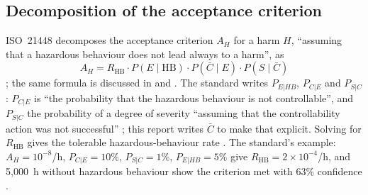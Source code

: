 \documentclass[11pt,a4paper]{article}
\newcommand{\RHB}{R_{\mathrm{HB}}}
\begin{document}
\subsection{Decomposition of the acceptance criterion}
ISO~21448 decomposes the acceptance criterion $A_H$ for a harm $H$, ``assuming that a hazardous behaviour does not lead always to a harm'', as
\begin{equation}
A_H = \RHB \cdot P(E\mid \mathrm{HB}) \cdot P(\bar C\mid E)\cdot P(S\mid \bar C)
\label{eq:annexc}
\end{equation}
\cite[C.2.1, Formula~(C.1), p.~127]{iso21448}; the same formula is discussed in \cite[Sec.~IV-B(a), Eq.~(1)]{putze2023} and \cite[Sec.~V, Eqs.~(6)--(7)]{betschinske2025}. The standard writes $P_{E|HB}$, $P_{C|E}$ and $P_{S|C}$: $P_{C|E}$ is ``the probability that the hazardous behaviour is not controllable'', and $P_{S|C}$ the probability of a degree of severity ``assuming that the controllability action was not successful'' \cite[C.2.1, p.~126]{iso21448}; this report writes $\bar C$ to make that explicit. Solving for $\RHB$ gives the tolerable hazardous-behaviour rate \cite[C.2.1, Formula~(C.2), p.~127]{iso21448}. The standard's example: $A_H=10^{-8}$/h, $P_{C|E}=10\%$, $P_{S|C}=1\%$, $P_{E|HB}=5\%$ give $\RHB=2\times10^{-4}$/h, and 5{,}000~h without hazardous behaviour show the criterion met with 63\% confidence \cite[C.2.1, Formula~(C.3) and Example, p.~127]{iso21448}.
\end{document}
